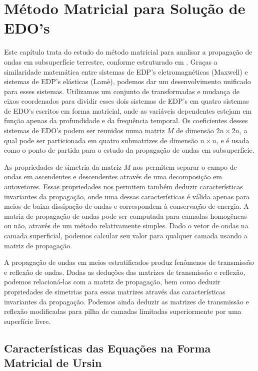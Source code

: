\chapter{M\'etodo Matricial para Solu\c{c}\~ao de EDO's}

Este cap\'itulo trata do estudo do m\'etodo matricial para analisar a propaga\c{c}\~ao de ondas em subsuperf\'icie terrestre, conforme estruturado em \cite{Ursin-1983}. Gra\c{c}as a similaridade matem\'atica entre sistemas de EDP's eletromagn\'eticas (Maxwell) e sistemas de EDP's el\'asticas (Lamè), podemos dar um desenvolvimento unificado para esses sistemas. Utilizamos um conjunto de transformadas e mudan\c{c}a de eixos coordenados para dividir esses dois sistemas de EDP's em quatro sistemas de EDO's escritos em forma matricial, onde as vari\'aveis dependentes estejam em fun\c{c}\~ao apenas da profundidade e da frequ\^encia temporal. Os coeficientes desses sistemas de EDO's podem ser reunidos numa matriz $M$ de dimens\~ao $2n\times 2n$, a qual pode ser particionada em quatro submatrizes de dimens\~ao $n\times n$, e \'e usada como o ponto de partida para o estudo da propaga\c{c}\~ao de ondas em subsuperf\'icie.  

As propriedades de simetria da matriz $M$ nos permitem separar o campo de ondas em ascendentes e descendentes atrav\'es de uma decomposi\c{c}\~ao em autovetores. Essas propriedades nos permitem tamb\'em deduzir caracter\'isticas invariantes da propaga\c{c}\~ao, onde uma dessas caracter\'isticas \'e v\'alida apenas para meios de baixa dissipa\c{c}\~ao de ondas e correspondem \`a conserva\c{c}\~ao de energia. A matriz de propaga\c{c}\~ao de ondas pode ser computada para camadas homog\^eneas ou n\~ao, atrav\'es de um m\'etodo relativamente simples. Dado o vetor de ondas na camada superficial, podemos calcular seu valor para qualquer camada usando a matriz de propaga\c{c}\~ao.

A propaga\c{c}\~ao de ondas em meios estratificados produz fen\^omenos de transmiss\~ao e reflex\~ao de ondas. Dadas as dedu\c{c}\~oes das matrizes de transmiss\~ao e reflex\~ao, podemos relacion\'a-las com a matriz de propaga\c{c}\~ao, bem como deduzir propriedades de simetrias para essas matrizes atrav\'es das caracter\'isticas invariantes da propaga\c{c}\~ao. Podemos ainda deduzir as matrizes de transmiss\~ao e reflex\~ao modificadas para pilha de camadas limitadas superiormente por uma superf\'icie livre.

\section{Caracter\'isticas das Equa\c{c}\~oes na Forma Matricial de Ursin}

